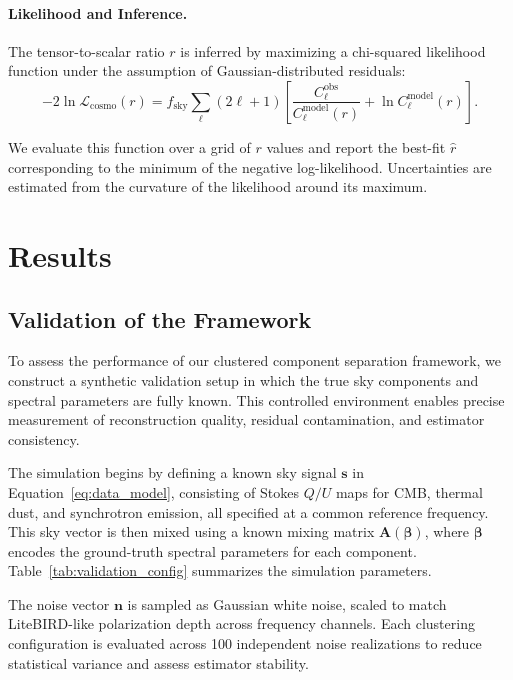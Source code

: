 \documentclass[%
 reprint,
bibnotes,
 amsmath,amssymb,
 aps,
floatfix, 
]{revtex4-2}
\begin{document}
\paragraph{Likelihood and Inference.}
The tensor-to-scalar ratio \( r \) is inferred by maximizing a chi-squared likelihood function under the assumption of Gaussian-distributed residuals:
\[
-2 \ln \mathcal{L}_{\mathrm{cosmo}}(r) = f_{\mathrm{sky}} \sum_\ell (2\ell + 1) \left[ \frac{C_\ell^{\mathrm{obs}}}{C_\ell^{\mathrm{model}}(r)} + \ln C_\ell^{\mathrm{model}}(r) \right].
\]


We evaluate this function over a grid of \( r \) values and report the best-fit \( \hat{r} \) corresponding to the minimum of the negative log-likelihood. Uncertainties are estimated from the curvature of the likelihood around its maximum.

\section{Results}
\label{sec:results}

\subsection{Validation of the Framework}
\label{subsec:validation}

To assess the performance of our clustered component separation framework, we construct a synthetic validation setup in which the true sky components and spectral parameters are fully known. This controlled environment enables precise measurement of reconstruction quality, residual contamination, and estimator consistency.

The simulation begins by defining a known sky signal \( \mathbf{s} \) in Equation~\eqref{eq:data_model}, consisting of Stokes \( Q/U \) maps for CMB, thermal dust, and synchrotron emission, all specified at a common reference frequency. This sky vector is then mixed using a known mixing matrix \( \mathbf{A}(\boldsymbol{\beta}) \), where \( \boldsymbol{\beta} \) encodes the ground-truth spectral parameters for each component. Table~\ref{tab:validation_config} summarizes the simulation parameters.

The noise vector \( \mathbf{n} \) is sampled as Gaussian white noise, scaled to match LiteBIRD-like polarization depth across frequency channels. Each clustering configuration is evaluated across 100 independent noise realizations to reduce statistical variance and assess estimator stability.
\end{document}
